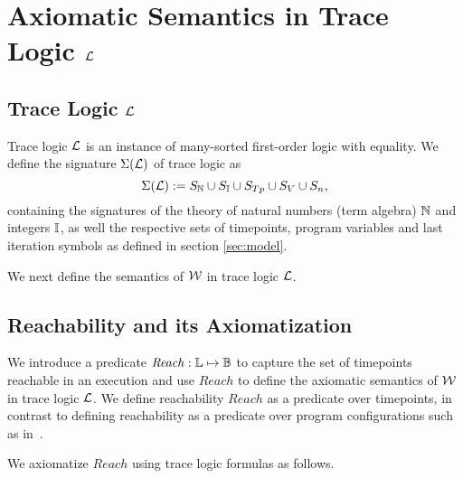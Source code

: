 
\section{Axiomatic Semantics in Trace Logic $\mathcal{L}$
}\label{sec:axiomatic-semantics}
 

\subsection{Trace Logic $\mathcal{L}$}
Trace logic $\mathcal{L}$ is an instance of
many-sorted first-order logic with equality. We define the signature
$\Sigma(\mathcal{L})$  of trace logic as 
$$ \Sigma(\mathcal{L}) : = S_{\mathbb{N}} \cup S_{\mathbb{I}} \cup S_{Tp} \cup S_V \cup S_n,$$
containing the signatures of the theory of natural numbers (term
algebra) $\mathbb{N}$ and integers $\mathbb{I}$,
as well the respective sets of timepoints, program variables and last
iteration symbols as defined in section \ref{sec:model}.

We next define the semantics of $\mathcal{W}$ in trace logic $\mathcal{L}$. 


%

\subsection{Reachability and its Axiomatization}\label{sec:reach} 
We introduce a predicate $\mathit{Reach}: \mathbb{L} \mapsto \mathbb{B}$
to capture the set of timepoints reachable in an execution and use
$\mathit{Reach}$ to define the axiomatic
semantics of $\mathcal{W}$ in trace logic $\mathcal{L}$.
We define reachability $\mathit{Reach}$ as a predicate over
timepoints, in contrast to defining reachability as a predicate over program
configurations such as in~\cite{hoder2012generalized, bjorner2015horn, fedyukovich2019quantified, ish2020putting}.

We axiomatize $\mathit{Reach}$ using trace
logic formulas as follows. 

